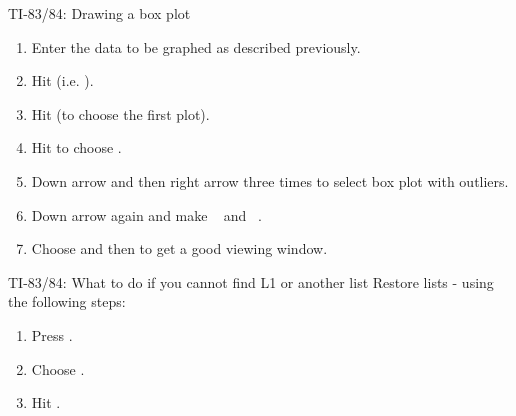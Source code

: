 \begin{onebox}{ TI-83/84:  Drawing a box plot}
\label{boxplot}
\begin{enumerate}
\setlength{\itemsep}{0mm}
\item Enter the data to be graphed as described previously.
\item Hit   (i.e. ).
\item Hit  (to choose the first plot).
\item Hit  to choose .
\item Down arrow and then right arrow three times to select box plot with outliers.
\item Down arrow again and make ~ and ~.
\item Choose  and then  to get a good viewing window.
\end{enumerate}
\end{onebox}

\begin{onebox}{TI-83/84: What to do if you cannot find {L1} or another list}
Restore lists - using the following steps:
\begin{enumerate}
\setlength{\itemsep}{0mm}
\item Press .
\item Choose .
\item Hit .
\end{enumerate}\end{onebox}


